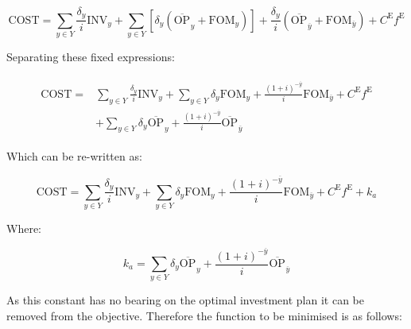 \documentclass{article}
\newcommand{\sYears}{Y}
\newcommand{\iYear}{y}
\newcommand{\iYearTerminal}{\overline{\iYear}}
\newcommand{\iScenario}{s}
\newcommand{\cOperatingCost}[1][\iYear,\iScenario]{\mathrm{OP}_{#1}}
\newcommand{\cFixedOperationsMaintenanceCost}[1][\iYear]{\mathrm{FOM}_{#1}}
\newcommand{\cInvestmentCost}[1][\iYear]{\mathrm{INV}_{#1}}
\newcommand{\cInterestRate}{i}
\newcommand{\cEmissionsTargetViolationPenalty}{C^{\mathrm{E}}}
\newcommand{\cObjectiveFunction}{\mathrm{COST}}
\newcommand{\cDiscountRate}[1][\iYear]{\delta_{#1}}
\newcommand{\vEmissionsTargetViolation}{f^{\mathrm{E}}}
\begin{document}
\begin{equation}
\cObjectiveFunction = \sum\limits_{\iYear \in \sYears} \frac{\cDiscountRate}{\cInterestRate}\cInvestmentCost + \sum\limits_{\iYear \in \sYears} \left[\cDiscountRate (\overline{\cOperatingCost[]}_{\iYear} + \cFixedOperationsMaintenanceCost) \right] + \frac{\cDiscountRate}{\cInterestRate} \left(\overline{\cOperatingCost[]}_{\iYearTerminal} + \cFixedOperationsMaintenanceCost[\iYearTerminal] \right) + \cEmissionsTargetViolationPenalty \vEmissionsTargetViolation
\end{equation}

Separating these fixed expressions:

\begin{align}
	\begin{split}
		\cObjectiveFunction = &\sum\limits_{\iYear \in \sYears} \frac{\cDiscountRate}{\cInterestRate}\cInvestmentCost + \sum\limits_{\iYear \in \sYears} \cDiscountRate \cFixedOperationsMaintenanceCost  + \frac{(1+\cInterestRate)^{-\iYearTerminal}}{\cInterestRate} \cFixedOperationsMaintenanceCost[\iYearTerminal] + \cEmissionsTargetViolationPenalty \vEmissionsTargetViolation\\
		& + \sum\limits_{\iYear \in \sYears} \cDiscountRate \overline{\cOperatingCost[]}_{\iYear} + \frac{(1+\cInterestRate)^{-\iYearTerminal}}{\cInterestRate} \overline{\cOperatingCost[]}_{\iYearTerminal}
	\end{split}
\end{align}

Which can be re-written as:

\begin{equation}
	\cObjectiveFunction = \sum\limits_{\iYear \in \sYears} \frac{\cDiscountRate}{\cInterestRate}\cInvestmentCost + \sum\limits_{\iYear \in \sYears} \cDiscountRate \cFixedOperationsMaintenanceCost  + \frac{(1+\cInterestRate)^{-\iYearTerminal}}{\cInterestRate} \cFixedOperationsMaintenanceCost[\iYearTerminal] + \cEmissionsTargetViolationPenalty \vEmissionsTargetViolation + k_{a}
\end{equation}

Where:

\begin{equation}
	k_{a} = \sum\limits_{\iYear \in \sYears} \cDiscountRate \overline{\cOperatingCost[]}_{\iYear} + \frac{(1+\cInterestRate)^{-\iYearTerminal}}{\cInterestRate} \overline{\cOperatingCost[]}_{\iYearTerminal}
\end{equation}

As this constant has no bearing on the optimal investment plan it can be removed from the objective. Therefore the function to be minimised is as follows:
\end{document}
